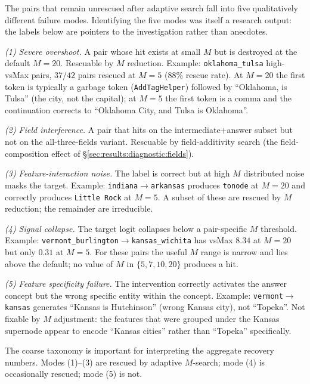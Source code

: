 The pairs that remain unrescued after adaptive search fall into five qualitatively different failure modes. Identifying the five modes was itself a research output: the labels below are pointers to the investigation rather than anecdotes.

\emph{(1) Severe overshoot.} A pair whose hit exists at small $M$ but is destroyed at the default $M{=}20$. Rescuable by $M$ reduction. Example: \texttt{oklahoma\_tulsa} high-vsMax pairs, $37/42$ pairs rescued at $M{=}5$ (88\% rescue rate). At $M{=}20$ the first token is typically a garbage token (\texttt{AddTagHelper}) followed by ``Oklahoma, is Tulsa'' (the city, not the capital); at $M{=}5$ the first token is a comma and the continuation corrects to ``Oklahoma City, and Tulsa is Oklahoma''.

\emph{(2) Field interference.} A pair that hits on the intermediate+answer subset but not on the all-three-fields variant. Rescuable by field-additivity search (the field-composition effect of \S\ref{sec:results:diagnostic:fields}).

\emph{(3) Feature-interaction noise.} The label is correct but at high $M$ distributed noise masks the target. Example: \texttt{indiana$\to$arkansas} produces \texttt{tonode} at $M{=}20$ and correctly produces \texttt{Little Rock} at $M{=}5$. A subset of these are rescued by $M$ reduction; the remainder are irreducible.

\emph{(4) Signal collapse.} The target logit collapses below a pair-specific $M$ threshold. Example: \texttt{vermont\_burlington$\to$kansas\_wichita} has vsMax $8.34$ at $M{=}20$ but only $0.31$ at $M{=}5$. For these pairs the useful $M$ range is narrow and lies above the default; no value of $M$ in $\{5, 7, 10, 20\}$ produces a hit.

\emph{(5) Feature specificity failure.} The intervention correctly activates the answer concept but the wrong specific entity within the concept. Example: \texttt{vermont$\to$kansas} generates ``Kansas is Hutchinson'' (wrong Kansas city), not ``Topeka''. Not fixable by $M$ adjustment: the features that were grouped under the Kansas supernode appear to encode ``Kansas cities'' rather than ``Topeka'' specifically.

The coarse taxonomy is important for interpreting the aggregate recovery numbers. Modes (1)--(3) are rescued by adaptive $M$-search; mode (4) is occasionally rescued; mode (5) is not.








